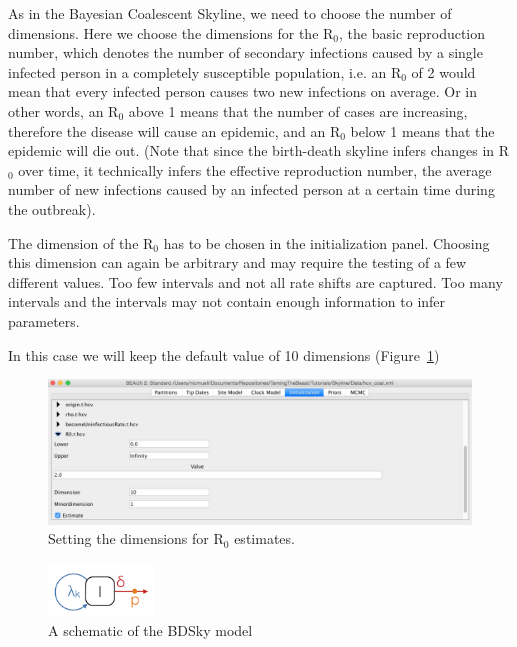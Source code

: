 \documentclass[11pt]{article}
\newcommand{\fixme}[1]{\textcolor{red}{\texttt{{\bf FIX ME:} #1}}}
\begin{document}
As in the Bayesian Coalescent Skyline, we need to choose the number of dimensions. Here we choose the dimensions for the R$_{0}$, the basic reproduction number, which denotes the number of secondary infections caused by a single infected person in a completely susceptible population, i.e. an R$_{0}$ of 2 would mean that every infected person causes two new infections on average. Or in other words, an R$_{0}$ above 1 means that the number of cases are increasing, therefore the disease will cause an epidemic, and an R$_{0}$ below 1 means that the epidemic will die out. (Note that since the birth-death skyline infers changes in R$_0$ over time, it technically infers the effective reproduction number, the average number of new infections caused by an infected person at a certain time during the outbreak).

The dimension of the R$_{0}$ has to be chosen in the initialization panel. Choosing this dimension can again be arbitrary and may require the testing of a few different values. Too few intervals and not all rate shifts are captured. Too many intervals and the intervals may not contain enough information to infer parameters.

In this case we will keep the default value of 10 dimensions (Figure~\ref{fig:dimensions_bdsky})

\begin{figure}[h!]
\centering
\includegraphics[width=\textwidth]{figures/choose_dimension_bdsky.png}
\caption{\small Setting the dimensions for R$_0$ estimates.}
\label{fig:dimensions_bdsky}
\end{figure}






\begin{figure}[h!]
\centering
\includegraphics[width=0.25\textwidth]{figures/bdsky_model.png}
\caption{\small A schematic of the BDSky model}
\label{fig:bdsky_model}
\end{figure}
\end{document}
